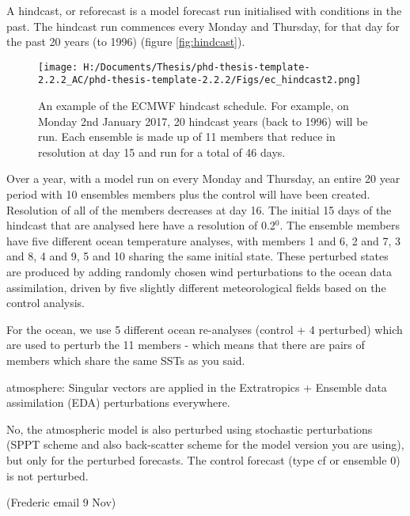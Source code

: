 A hindcast, or reforecast is a model forecast run initialised with conditions in the past. The hindcast run commences every Monday and Thursday, for that day for the past 20 years (to 1996) (figure \ref{fig:hindcast}).

\begin{figure} [h]
	\texttt{[image: H:/Documents/Thesis/phd-thesis-template-2.2.2\_AC/phd-thesis-template-2.2.2/Figs/ec\_hindcast2.png]}
	\caption{An example of the ECMWF hindcast schedule. For example, on Monday 2nd January 2017, 20 hindcast years (back to 1996) will be run. Each ensemble is made up of 11 members that reduce in resolution at day 15 and run for a total of 46 days.}\label{fig:ecmwf_hindcast}
	\centering
\end{figure} \label{fig:hindcast}	

Over a year, with a model run on every Monday and Thursday, an entire 20 year period with 10 ensembles members plus the control will have been created. Resolution of all of the members decreases at day 16. The initial 15 days of the hindcast that are analysed here have a resolution of 0.2$^0$. The ensemble members have five different ocean temperature analyses, with members 1 and 6, 2 and 7, 3 and 8, 4 and 9, 5 and 10 sharing the same initial state. These perturbed states are produced by adding randomly chosen wind perturbations to the ocean data assimilation, driven by five slightly different meteorological fields based on the control analysis.

For the ocean, we use 5 different ocean re-analyses (control + 4 perturbed) which are used to perturb the 11 members - which means that there are pairs of members which share the same SSTs as you said.

atmosphere: Singular vectors are applied in the Extratropics + Ensemble data assimilation (EDA) perturbations everywhere.

No, the atmospheric model is also perturbed using stochastic perturbations (SPPT scheme and also back-scatter scheme for the model version you are using), but only for the perturbed forecasts. The control forecast (type  cf or ensemble 0) is not perturbed. 

(Frederic email 9 Nov)

